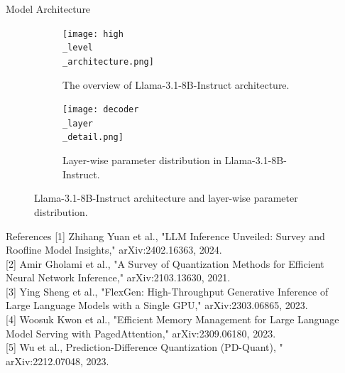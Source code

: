 \documentclass[final]{beamer}
\newlength{\sepwidth}
\newlength{\colwidth}
\newcommand{\separatorcolumn}{\begin{column}{\sepwidth}\end{column}}
\begin{document}
\begin{frame}[t]
\begin{columns}[t]
\begin{column}{\colwidth}
\begin{block}{Model Architecture}
\begin{itemize}
      \end{itemize}
      \begin{figure}
        \begin{subfigure}{0.48\colwidth}
          \centering
          \texttt{[image: high\\\_level\\\_architecture.png]}
          \caption{The overview of Llama-3.1-8B-Instruct architecture.}
          \label{fig:llama_sturcture}
        \end{subfigure}
        \hfill
        \begin{subfigure}{0.48\colwidth}
          \centering
          \texttt{[image: decoder\\\_layer\\\_detail.png]}
          \caption{Layer-wise parameter distribution in Llama-3.1-8B-Instruct.}
          \label{fig:decode_layer}
        \end{subfigure}
        \caption{Llama-3.1-8B-Instruct architecture and layer-wise parameter distribution.}
      \end{figure}
  \end{block}
  \begin{block}{References}
    \vspace{0.5em}
     [1] Zhihang Yuan et al., "LLM Inference Unveiled: Survey and Roofline Model Insights," arXiv:2402.16363, 2024.\\ {}
     [2] Amir Gholami et al., "A Survey of Quantization Methods for Efficient Neural Network Inference," arXiv:2103.13630, 2021.\\ {}
     [3] Ying Sheng et al., "FlexGen: High-Throughput Generative Inference of Large Language Models with a Single GPU," arXiv:2303.06865, 2023.\\ {}
     [4] Woosuk Kwon et al., "Efficient Memory Management for Large Language Model Serving with PagedAttention," arXiv:2309.06180, 2023.\\ {}
     [5] Wu et al., Prediction-Difference Quantization (PD-Quant), " arXiv:2212.07048, 2023. \\ {}
     \vspace{0.5em}
  \end{block}
 \end{column}

 \separatorcolumn


\end{columns}
\end{frame}
\end{document}
